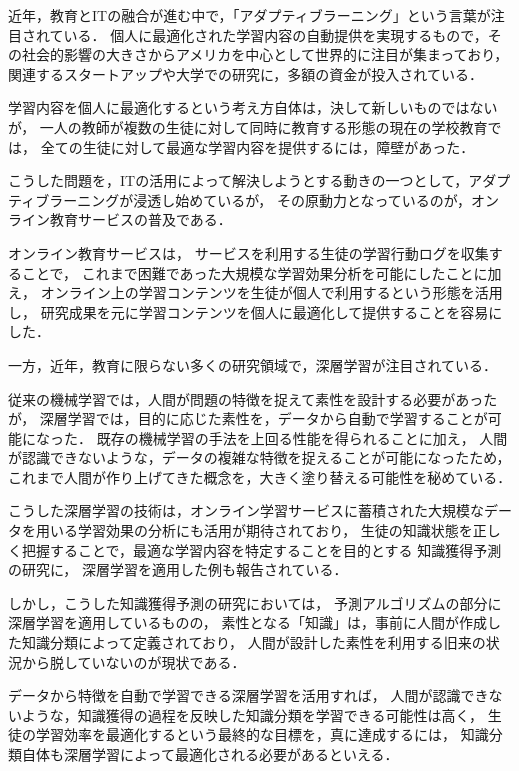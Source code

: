 近年，教育とITの融合が進む中で，「アダプティブラーニング」という言葉が注目されている．
個人に最適化された学習内容の自動提供を実現するもので，その社会的影響の大きさからアメリカを中心として世界的に注目が集まっており，
関連するスタートアップや大学での研究に，多額の資金が投入されている．

学習内容を個人に最適化するという考え方自体は，決して新しいものではないが，
一人の教師が複数の生徒に対して同時に教育する形態の現在の学校教育では，
全ての生徒に対して最適な学習内容を提供するには，障壁があった．


こうした問題を，ITの活用によって解決しようとする動きの一つとして，アダプティブラーニングが浸透し始めているが，
その原動力となっているのが，オンライン教育サービスの普及である．

オンライン教育サービスは，
サービスを利用する生徒の学習行動ログを収集することで，
これまで困難であった大規模な学習効果分析を可能にしたことに加え，
オンライン上の学習コンテンツを生徒が個人で利用するという形態を活用し，
研究成果を元に学習コンテンツを個人に最適化して提供することを容易にした．


一方，近年，教育に限らない多くの研究領域で，深層学習が注目されている．

従来の機械学習では，人間が問題の特徴を捉えて素性を設計する必要があったが，
深層学習では，目的に応じた素性を，データから自動で学習することが可能になった．
既存の機械学習の手法を上回る性能を得られることに加え，
人間が認識できないような，データの複雑な特徴を捉えることが可能になったため，
これまで人間が作り上げてきた概念を，大きく塗り替える可能性を秘めている．


こうした深層学習の技術は，オンライン学習サービスに蓄積された大規模なデータを用いる学習効果の分析にも活用が期待されており，
生徒の知識状態を正しく把握することで，最適な学習内容を特定することを目的とする
知識獲得予測の研究に，
深層学習を適用した例も報告されている．

しかし，こうした知識獲得予測の研究においては，
予測アルゴリズムの部分に深層学習を適用しているものの，
素性となる「知識」は，事前に人間が作成した知識分類によって定義されており，
人間が設計した素性を利用する旧来の状況から脱していないのが現状である．

データから特徴を自動で学習できる深層学習を活用すれば，
人間が認識できないような，知識獲得の過程を反映した知識分類を学習できる可能性は高く，
生徒の学習効率を最適化するという最終的な目標を，真に達成するには，
知識分類自体も深層学習によって最適化される必要があるといえる．


